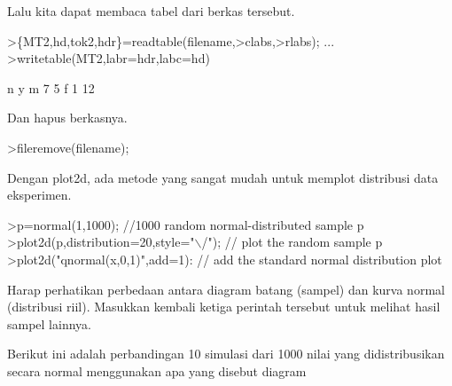 \documentclass[a4paper,10pt]{article}
\begin{document}
\begin{eulernotebook}
\begin{eulercomment}
\begin{eulercomment}
\begin{eulercomment}
\begin{eulercomment}
\begin{eulercomment}
\begin{eulercomment}
\begin{eulercomment}
\begin{eulercomment}
\begin{eulercomment}
\begin{eulercomment}
\begin{eulercomment}
\begin{eulercomment}
\begin{eulercomment}
\begin{eulercomment}
\begin{eulercomment}
\begin{eulercomment}
\begin{eulercomment}
\begin{eulercomment}
\begin{eulercomment}
\begin{eulercomment}
\begin{eulercomment}
\begin{eulercomment}
\begin{eulercomment}
\begin{eulercomment}
\begin{eulercomment}
\begin{eulercomment}
\begin{eulercomment}
\begin{eulercomment}
\begin{eulercomment}
\begin{eulercomment}
\begin{eulercomment}
\begin{eulercomment}
\begin{eulerprompt}
\end{eulerprompt}
\begin{eulercomment}
Lalu kita dapat membaca tabel dari berkas tersebut.
\end{eulercomment}
\begin{eulerprompt}
>\{MT2,hd,tok2,hdr\}=readtable(filename,>clabs,>rlabs); ...
>writetable(MT2,labr=hdr,labc=hd)
\end{eulerprompt}
\begin{euleroutput}
                     n         y
           m         7         5
           f         1        12
\end{euleroutput}
\begin{eulercomment}
Dan hapus berkasnya.
\end{eulercomment}
\begin{eulerprompt}
>fileremove(filename);
\end{eulerprompt}
\begin{eulercomment}
Dengan plot2d, ada metode yang sangat mudah untuk memplot distribusi
data eksperimen.
\end{eulercomment}
\begin{eulerprompt}
>p=normal(1,1000); //1000 random normal-distributed sample p
>plot2d(p,distribution=20,style="\(\backslash\)/"); // plot the random sample p
>plot2d("qnormal(x,0,1)",add=1): // add the standard normal distribution plot
\end{eulerprompt}
\begin{eulercomment}
Harap perhatikan perbedaan antara diagram batang (sampel) dan kurva
normal (distribusi riil). Masukkan kembali ketiga perintah tersebut
untuk melihat hasil sampel lainnya.
\end{eulercomment}
\begin{eulercomment}
Berikut ini adalah perbandingan 10 simulasi dari 1000 nilai yang
didistribusikan secara normal menggunakan apa yang disebut diagram

\end{eulercomment}
\end{eulercomment}
\end{eulercomment}
\end{eulercomment}
\end{eulercomment}
\end{eulercomment}
\end{eulercomment}
\end{eulercomment}
\end{eulercomment}
\end{eulercomment}
\end{eulercomment}
\end{eulercomment}
\end{eulercomment}
\end{eulercomment}
\end{eulercomment}
\end{eulercomment}
\end{eulercomment}
\end{eulercomment}
\end{eulercomment}
\end{eulercomment}
\end{eulercomment}
\end{eulercomment}
\end{eulercomment}
\end{eulercomment}
\end{eulercomment}
\end{eulercomment}
\end{eulercomment}
\end{eulercomment}
\end{eulercomment}
\end{eulercomment}
\end{eulercomment}
\end{eulercomment}
\end{eulercomment}
\end{eulernotebook}
\end{document}
